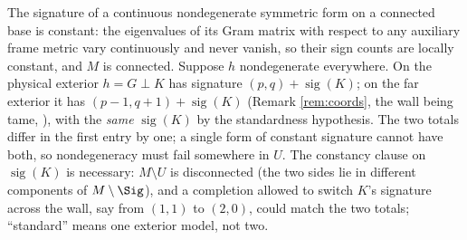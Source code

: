 The signature of a continuous nondegenerate symmetric form on a connected base is constant: the eigenvalues of its Gram matrix with respect to any auxiliary frame metric vary continuously and never vanish, so their sign counts are locally constant, and $M$ is connected. Suppose $h$ nondegenerate everywhere. On the physical exterior $h = G \perp K$ has signature $(p,q) + \operatorname{sig}(K)$; on the far exterior it has $(p{-}1, q{+}1) + \operatorname{sig}(K)$ (Remark \ref{rem:coords}, the wall being tame, ), with the \emph{same} $\operatorname{sig}(K)$ by the standardness hypothesis. The two totals differ in the first entry by one; a single form of constant signature cannot have both, so nondegeneracy must fail somewhere in $U$. The constancy clause on $\operatorname{sig}(K)$ is necessary: $M \setminus U$ is disconnected (the two sides lie in different components of $M \setminus \Sig$), and a completion allowed to switch $K$'s signature across the wall, say from $(1,1)$ to $(2,0)$, could match the two totals; ``standard'' means one exterior model, not two.

